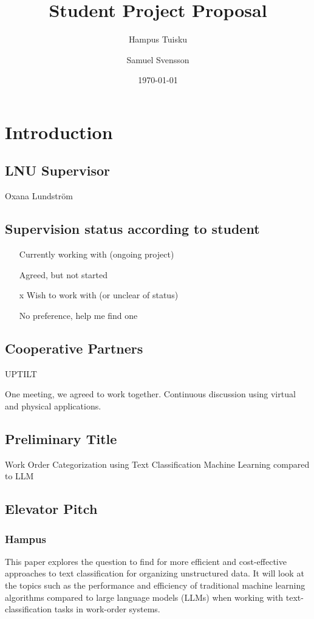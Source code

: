 \documentclass{article}
\title{Student Project Proposal}
\author{Hampus Tuisku \and Samuel Svensson}
\date{\today}
\begin{document}
\maketitle

\section{Introduction}

\subsection{LNU Supervisor}
Oxana Lundström

\subsection{Supervision status according to student}

\begin{itemize}
      \item [ ] Currently working with (ongoing project)
      \item [ ] Agreed, but not started
      \item [x] Wish to work with (or unclear of status)
      \item [ ] No preference, help me find one
\end{itemize}

\subsection{Cooperative Partners}

UPTILT

One meeting, we agreed to work together.
Continuous discussion using virtual and physical applications.

\subsection{Preliminary Title}

Work Order Categorization using Text Classification Machine Learning compared to LLM

\subsection{Elevator Pitch}

\subsubsection{Hampus}
This paper explores the question to find for more efficient and cost-effective approaches to text classification for
organizing unstructured data. It will look at the topics such as the performance and efficiency of traditional
machine learning algorithms compared to large language models (LLMs) when working with text-classification tasks in work-order systems.
\end{document}
